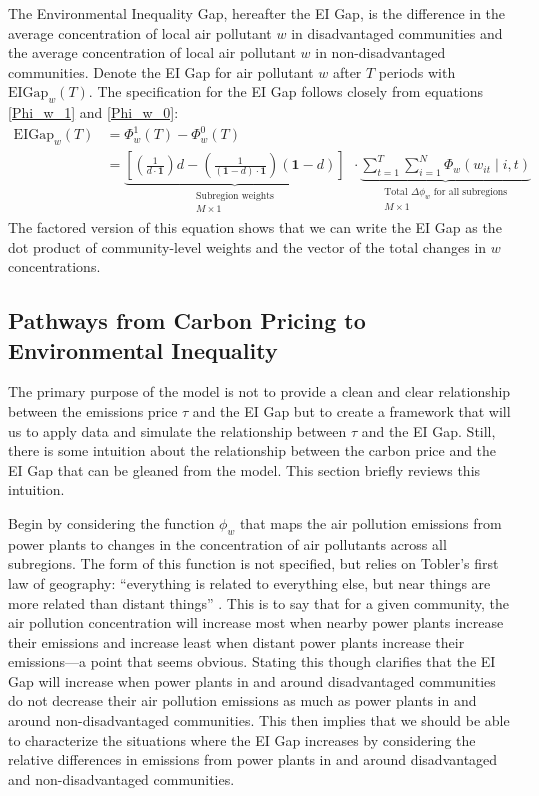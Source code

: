 The Environmental Inequality Gap, hereafter the EI Gap, is the difference in the average concentration of local air pollutant $w$ in disadvantaged communities and the average concentration of local air pollutant $w$ in non-disadvantaged communities. Denote the EI Gap for air pollutant $w$ after $T$ periods with $\text{EIGap}_w(T)$. The specification for the EI Gap follows closely from equations \eqref{Phi_w_1} and \eqref{Phi_w_0}:
\begin{align}
    \text{EIGap}_w(T) &= \Phi_w^1(T) - \Phi_w^0(T) \\
        &= \underbrace{\left[
            \left(\frac{1}{d \cdot \textbf{1}}\right) d - \left(\frac{1}{(\textbf{1} - d) \cdot \textbf{1}}\right) \left(\textbf{1} - d\right)
        \right]}_{\substack{\text{Subregion weights}\\ M\times 1 }} ~~ \cdot \underbrace{\sum_{t = 1}^T \sum_{i=1}^N \Phi_w(w_{it}\mid i, t)}_{\substack{\text{Total $\Delta \phi_w$ for all subregions}\\ M \times 1}}
\end{align}
The factored version of this equation shows that we can write the EI Gap as the dot product of community-level weights and the vector of the total changes in $w$ concentrations. 


\subsection{Pathways from Carbon Pricing to Environmental Inequality}

The primary purpose of the model is not to provide a clean and clear relationship between the emissions price $\tau$ and the EI Gap but to create a framework that will us to apply data and simulate the relationship between $\tau$ and the EI Gap. Still, there is some intuition about the relationship between the carbon price and the EI Gap that can be gleaned from the model. This section briefly reviews this intuition. 

Begin by considering the function $\phi_w$ that maps the air pollution emissions from power plants to changes in the concentration of air pollutants across all subregions. The form of this function is not specified, but relies on Tobler's first law of geography: ``everything is related to everything else, but near things are more related than distant things'' \citep{tobler1970computer}. This is to say that for a given community, the air pollution concentration will increase most when nearby power plants increase their emissions and increase least when distant power plants increase their emissions---a point that seems obvious. Stating this though clarifies that the EI Gap will increase when power plants in and around disadvantaged communities do not decrease their air pollution emissions as much as power plants in and around non-disadvantaged communities. This then implies that we should be able to characterize the situations where the EI Gap increases by considering the relative differences in emissions from power plants in and around disadvantaged and non-disadvantaged communities. 

